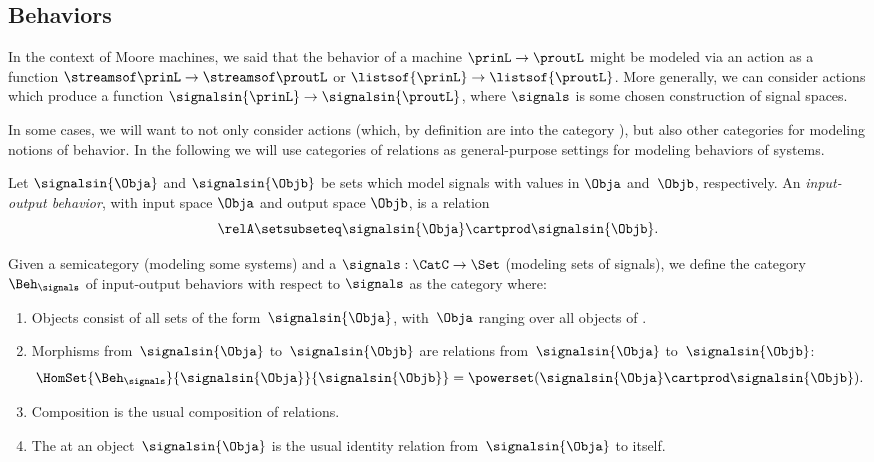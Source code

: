 \subsection{Behaviors}


In the context of Moore machines, we said that the behavior of a machine $\prinL \to \proutL$ might be modeled via an action as a function $\streamsof\prinL  \to \streamsof\proutL$ or $\listsof{\prinL} \to \listsof{\proutL}$.
More generally, we can consider actions which produce a function $\signalsin{\prinL} \to \signalsin{\proutL}$, where $\signals$ is some chosen construction of signal spaces.

In some cases, we will want to not only consider actions (which, by definition are into the category \Set), but also other categories for modeling notions of behavior.
In the following we will use categories of relations as general-purpose settings for modeling behaviors of systems.

\begin{definition}\label{def:input-output-beh}
    Let $\signalsin{\Obja}$ and $\signalsin{\Objb}$ be sets which model signals with values in $\Obja$ and~$\Objb$, respectively.
    An \emph{input-output behavior}, with input space $\Obja$ and output space $\Objb$, is a relation
    \begin{equation}
        \relA \setsubseteq \signalsin{\Obja} \cartprod \signalsin{\Objb}.
    \end{equation}
\end{definition}

\begin{definition}
    \label{def:Beh}
    Given a semicategory \CatC (modeling some systems) and a  $\signals: \CatC \to \Set$ (modeling sets of signals), we define the category~$\Beh_\signals$ of input-output behaviors with respect to $\signals$ as the category where:
    \begin{enumerate}
        \item Objects consist of all sets of the form~$\signalsin{\Obja}$, with~$\Obja$ ranging over all objects of \CatC.
        \item Morphisms from~$\signalsin{\Obja}$ to~$\signalsin{\Objb}$ are relations from~$\signalsin{\Obja}$ to~$\signalsin{\Objb}$:
              \begin{equation}
                  \HomSet{\Beh_\signals}{\signalsin{\Obja}}{\signalsin{\Objb}} = \powerset (\signalsin{\Obja} \cartprod \signalsin{\Objb}).
              \end{equation}
        \item Composition is the usual composition of relations.
        \item The  at an object~$\signalsin{\Obja}$ is the usual identity relation from~$\signalsin{\Obja}$ to itself.
    \end{enumerate}
\end{definition}

